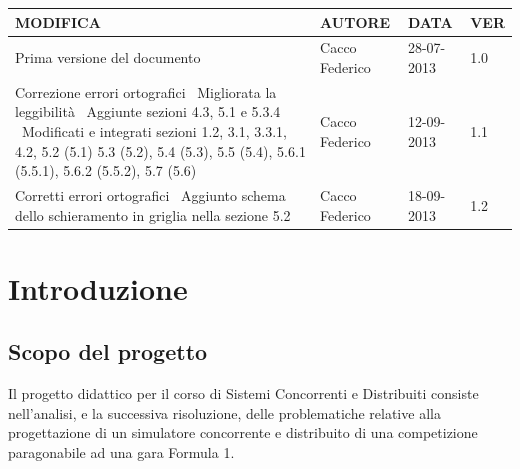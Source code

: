 \documentclass[a4paper,11pt, twoside, openright]{book}
\begin{document}
    \begin{small}
      
      \begin{longtable}{|p{6cm}|p{2.4cm}|p{1.8cm}|p{0.8cm}|}
	\toprule
	  \bfseries{MODIFICA} & \bfseries{AUTORE} & \bfseries{DATA} & \bfseries{VER} \\
	\hline \hline \endfirsthead
	
	Prima versione del documento & Cacco Federico & 28-07-2013 & 1.0 \\\hline
	
	Correzione errori ortografici \newline\
	Migliorata la leggibilità \newline\
	Aggiunte sezioni 4.3, 5.1 e 5.3.4 \newline\
	Modificati e integrati sezioni 1.2, 3.1, 3.3.1, 4.2, 5.2 (5.1)
	5.3 (5.2), 5.4 (5.3), 5.5 (5.4), 5.6.1 (5.5.1), 5.6.2 (5.5.2), 5.7 (5.6)

	& Cacco Federico & 12-09-2013 & 1.1 \\\hline
        Corretti errori ortografici \newline\
	Aggiunto schema dello schieramento in griglia nella sezione 5.2 & Cacco Federico & 18-09-2013 & 1.2 \\\hline

      \end{longtable}
      
    \end{small}
      
  \tableofcontents
  
  \chapter{Introduzione}
    \setcounter{page}{1}
    
    \section{Scopo del progetto}
      Il progetto didattico per il corso di Sistemi Concorrenti e Distribuiti consiste nell'analisi, e la
      successiva risoluzione,
      delle problematiche relative alla progettazione di un simulatore concorrente e distribuito 
      di una competizione paragonabile ad una gara Formula 1.
      
\end{document}
